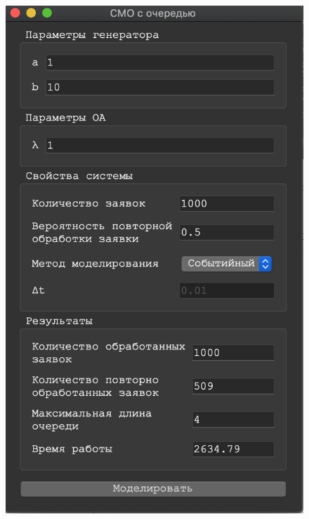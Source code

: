 \documentclass[a4paper,12pt]{article}
\begin{document}
\begin{figure}[h!]
\begin{minipage}[b]{0.32\textwidth}
			\includegraphics[width=\textwidth]{sob_3_2.png}
		\end{minipage}
		\begin{minipage}[b]{0.32\textwidth}

\end{minipage}
\end{figure}
\end{document}
